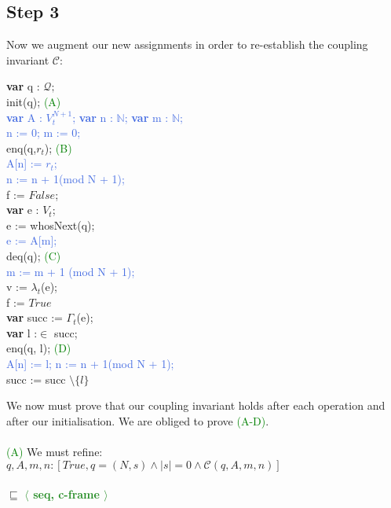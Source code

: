\documentclass[a4paper]{scrartcl}
\newcommand{\N}{\mathbb{N}}
\newcommand{\C}{\mathcal{C}}
\newcommand{\refinedby}{\sqsubseteq} %
\newcommand{\rc}[1]{ $\refinedby$ \quad \textbf{\textcolor{ForestGreen}{$\langle$ #1 $\rangle$}}}
\newcommand{\ab}[1]{\textcolor{WildStrawberry}{#1}}
\newcommand{\con}[1]{\textcolor{RoyalBlue}{#1}}
\newcommand{\tabb}{\null \quad}
\begin{document}
{\subsection{Step 3}
%
Now we augment our new assignments in order to re-establish the coupling invariant $\C$: \\
%
%
\begin{algorithm}[H]
\textbf{var} q : $\mathcal{Q};$ \\
\ab{init(q)}; \textcolor{green}{\tabb (A)}\\ 
\con{
\textbf{var} A : $V_t^{N+1}$; 
\textbf{var} n : $\N$;
\textbf{var} m : $\N$;
} \\
\con {
n := 0; m := 0;
} \\
\ab{enq(q,$r_t$)}; \textcolor{green}{\tabb (B)}\\
\con{A[n] := $r_t$; \\
n := n + 1(mod N + 1);} \\
f := $False$; \\
\While {$\neg( f \lor \ab{isEmpty(q)})$} {
	\textbf{var} e : $V_t$; \\
	\ab{e := whosNext(q)}; \\
	\con{e := A[m];} \\
	\ab{deq(q)}; \textcolor{green}{\tabb (C)}\\
	\con{m := m + 1 (mod N + 1);} \\
	 {
		v := $\lambda_t$(e); \\
		f := $True$ \\
	} {
		\textbf{var} succ := $\Gamma_t$(e); \\
		 {
			\textbf{var} l :$\in$ succ; \\
			\ab{enq(q, l)}; \textcolor{green}{\tabb (D)}\\
			\con{
			A[n] := l; n := n + 1(mod N + 1);
			} \\
			succ := succ $\setminus \{l\}$ \\
		}
	}
}
\end{algorithm}
%
%
We now must prove that our coupling invariant holds after each operation and after our initialisation. We are obliged to prove \textcolor{green}{(A-D)}.\\ \\
%
\textcolor{green}{(A)}
We must refine: \\
%
$q, A, m, n : [True, q = (N,s) \land |s| = 0 \land \C(q,A,m,n)]$ \\ \\ 
%
\rc{seq, c-frame} \\
}
\end{document}
